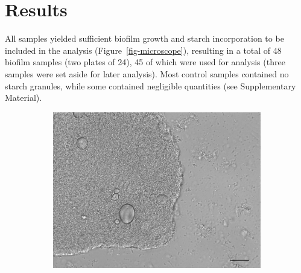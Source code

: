 \documentclass[
  b5paper,
]{book}
\begin{document}
\hypertarget{results-1}{%
\section{Results}\label{results-1}}

All samples yielded sufficient biofilm growth and starch incorporation
to be included in the analysis (Figure~\ref{fig-microscope}), resulting
in a total of 48 biofilm samples (two plates of 24), 45 of which were
used for analysis (three samples were set aside for later analysis).
Most control samples contained no starch granules, while some contained
negligible quantities (see Supplementary Material).

\begin{figure}

\begin{minipage}[t]{0.50\linewidth}

{\centering 

\begin{figure}[H]

{\centering \includegraphics[width=4.63in,height=\textheight]{figures/starches_w_bar.jpg}

}

\end{figure}

}

\end{minipage}%
%
\begin{minipage}[t]{0.50\linewidth}

{\centering 

\begin{figure}[H]


\end{figure}}
\end{minipage}
\end{figure}
\end{document}
